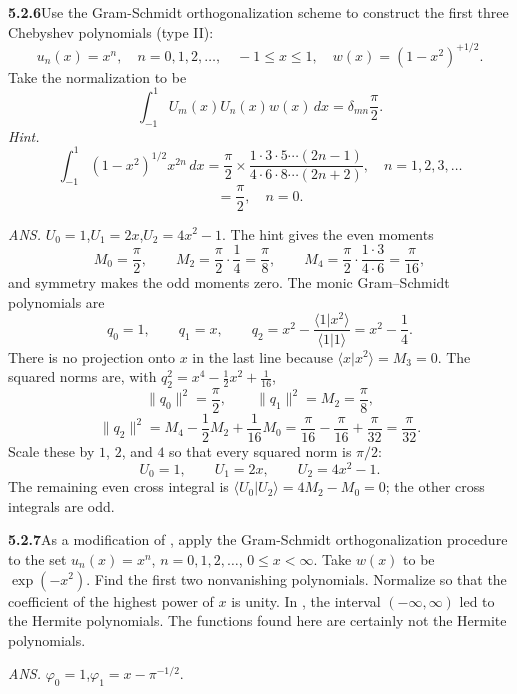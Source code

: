 \par\bigskip
\noindent\textbf{5.2.6}\quad Use the Gram-Schmidt orthogonalization scheme to
construct the first three Chebyshev polynomials (type II):
\[
u_{n}(x)=x^{n},\quad n=0,1,2,\ldots,\quad-1\le x\le1,\quad
w(x)=(1-x^{2})^{+1/2}.
\]
Take the normalization to be
\[
\int_{-1}^{1}U_{m}(x)U_{n}(x)w(x)\,dx=\delta_{mn}\frac{\pi}{2}.
\]
\emph{Hint.}
\[
\int_{-1}^{1}(1-x^{2})^{1/2}x^{2n}\,dx
=\frac{\pi}{2}\times\frac{1\cdot3\cdot5\cdots(2n-1)}
{4\cdot6\cdot8\cdots(2n+2)},\quad n=1,2,3,\ldots
\]
\[
=\frac{\pi}{2},\quad n=0.
\]
\par\nobreak\hfill\emph{ANS.}\enspace
$U_{0}=1$,\quad$U_{1}=2x$,\quad$U_{2}=4x^{2}-1$.
\solution
The hint gives the even moments
\[
M_0=\frac\pi2,\qquad M_2=\frac\pi2\cdot\frac14=\frac\pi8,\qquad
M_4=\frac\pi2\cdot\frac{1\cdot3}{4\cdot6}=\frac\pi{16},
\]
and symmetry makes the odd moments zero. The monic Gram--Schmidt
polynomials are
\[
q_0=1,\qquad q_1=x,\qquad
q_2=x^2-\frac{\langle1|x^2\rangle}{\langle1|1\rangle}
=x^2-\frac14.
\]
There is no projection onto $x$ in the last line because
$\langle x|x^2\rangle=M_3=0$. The squared norms are, with
$q_2^2=x^4-\frac12x^2+\frac1{16}$,
\[
\|q_0\|^2=\frac\pi2,\qquad \|q_1\|^2=M_2=\frac\pi8,
\]
\[
\|q_2\|^2=M_4-\frac12M_2+\frac1{16}M_0
=\frac\pi{16}-\frac\pi{16}+\frac\pi{32}=\frac\pi{32}.
\]
Scale these by $1$, $2$, and $4$ so that every squared norm is $\pi/2$:
\[
\boxed{U_0=1,\qquad U_1=2x,\qquad U_2=4x^2-1}.
\]
The remaining even cross integral is
$\langle U_0|U_2\rangle=4M_2-M_0=0$; the other cross integrals are odd.

\par\bigskip
\noindent\textbf{5.2.7}\quad As a modification of , apply the
Gram-Schmidt orthogonalization procedure to the set $u_{n}(x)=x^{n}$,
$n=0,1,2,\ldots$, $0\le x<\infty$. Take $w(x)$ to be $\exp(-x^{2})$. Find the
first two nonvanishing polynomials. Normalize so that the coefficient of the
highest power of $x$ is unity. In , the interval $(-\infty,
\infty)$ led to the Hermite polynomials. The functions found here are
certainly not the Hermite polynomials.
\par\nobreak\hfill\emph{ANS.}\enspace
$\varphi_{0}=1$,\quad$\varphi_{1}=x-\pi^{-1/2}$.
\solution
{}

